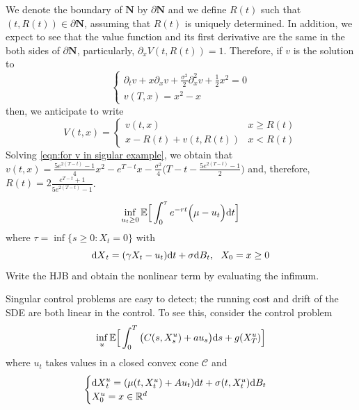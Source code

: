 \documentclass[11pt]{book}
\newcommand{\dd}{\text{\normalfont d}}
\newcommand{\dt}{\text{\normalfont d}t}
\newcommand{\ds}{\text{\normalfont d}s}
\newcommand{\dX}{\text{\normalfont d}X}
\begin{document}
\begin{eg}
We denote the boundary of $\mathbf{N}$ by $\partial \mathbf{N}$ and we define $R(t)$ such that $(t,R(t))\in\partial\mathbf{N}$, assuming that $R(t)$ is uniquely determined.
In addition, we expect to see that the value function and its first derivative are the same in the both sides of $\partial \mathbf{N}$, particularly, $\partial_x V(t,R(t))=1$. Therefore, if $v$ is the solution to 
    \begin{equation}\label{eqn:for v in sigular example}
        \begin{cases}
            \partial_t v + x\partial_x v + \frac{\sigma^2}{2}\partial^2_{x} v + \frac12x^2 =0\\
            v(T,x)=x^2-x
        \end{cases}
    \end{equation}
    then, we anticipate to write 
    \begin{equation}
        V(t,x)=\begin{cases}
            v(t,x)& x\ge R(t)\\
            x-R(t)+v(t,R(t))& x< R(t)
        \end{cases}
    \end{equation}
Solving \eqref{eqn:for v in sigular example}, we obtain that $v(t,x)=\frac{5e^{2(T-t)}-1}{4}x^2-e^{T-t}x-\frac{\sigma^2}{4}\Big(T-t-\frac{5e^{2(T-t)}-1}{2}\Big)$ and, therefore, $R(t)=2\frac{e^{T-t}+1}{5e^{2(T-t)}-1}$. 
\end{eg}
\begin{ex}\label{ex:DS}
    \begin{equation}
        \inf_{u_t\ge0}\mathbb{E}\Big[\int_0^\tau e^{-r t} \Big(\mu - u_t\Big){\dt}\Big]
    \end{equation}
    where $\tau=\inf\{s\ge0: X_t=0\}$ with
    \begin{equation}
        {\dX}_t=(\gamma X_t-u_t){{\dt}}+\sigma {\dd}B_t, ~~ X_0=x\ge0
    \end{equation}
    Write the HJB and obtain the nonlinear term by evaluating the infimum. 
\end{ex}
Singular control problems are easy to detect; the running cost and drift of the SDE are both linear in the control. To see this, consider the control problem
\begin{equation}\label{eqn:dpp_singular}
        \inf_{u}\mathbb{E}\Big[\int_0^T \big(C(s,X^u_s)+au_s\big){{\ds}} + g(X_T^u)\Big]
    \end{equation}
where $u_t$ takes values in a closed convex cone $\mathcal{C}$ and 
\begin{equation}
	\begin{cases}
	    {\dX}^u_t =(\mu(t,X_t^u)+Au_t){{\dt}}+\sigma(t,X_t^u){\dd}B_t\\
     X^u_0=x\in\mathbb{R}^d
	\end{cases}
\end{equation}
\end{document}
